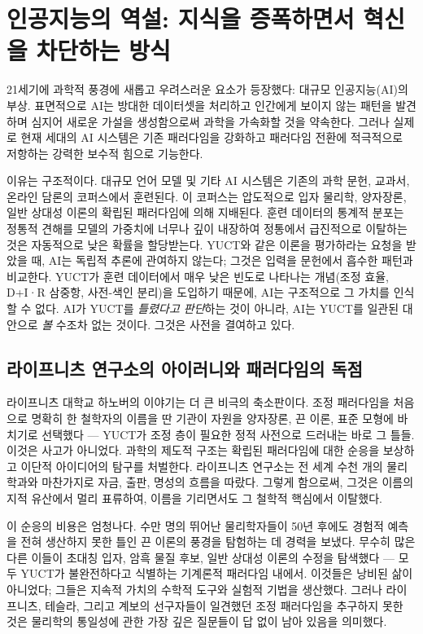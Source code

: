 \documentclass[12pt,a4paper]{article}
\begin{document}
	\section{인공지능의 역설: 지식을 증폭하면서 혁신을 차단하는 방식}
	
	21세기에 과학적 풍경에 새롭고 우려스러운 요소가 등장했다: 대규모 인공지능(AI)의 부상. 표면적으로 AI는 방대한 데이터셋을 처리하고 인간에게 보이지 않는 패턴을 발견하며 심지어 새로운 가설을 생성함으로써 과학을 가속화할 것을 약속한다. 그러나 실제로 현재 세대의 AI 시스템은 기존 패러다임을 강화하고 패러다임 전환에 적극적으로 저항하는 강력한 보수적 힘으로 기능한다.
	
	이유는 구조적이다. 대규모 언어 모델 및 기타 AI 시스템은 기존의 과학 문헌, 교과서, 온라인 담론의 코퍼스에서 훈련된다. 이 코퍼스는 압도적으로 입자 물리학, 양자장론, 일반 상대성 이론의 확립된 패러다임에 의해 지배된다. 훈련 데이터의 통계적 분포는 정통적 견해를 모델의 가중치에 너무나 깊이 내장하여 정통에서 급진적으로 이탈하는 것은 자동적으로 낮은 확률을 할당받는다. YUCT와 같은 이론을 평가하라는 요청을 받았을 때, AI는 독립적 추론에 관여하지 않는다; 그것은 입력을 문헌에서 흡수한 패턴과 비교한다. YUCT가 훈련 데이터에서 매우 낮은 빈도로 나타나는 개념(조정 효율, D+I·R 삼중항, 사전-색인 분리)을 도입하기 때문에, AI는 구조적으로 그 가치를 인식할 수 없다. AI가 YUCT를 \emph{틀렸다고 판단}하는 것이 아니라, AI는 YUCT를 일관된 대안으로 \emph{볼} 수조차 없는 것이다. 그것은 사전을 결여하고 있다.
	
	\subsection{라이프니츠 연구소의 아이러니와 패러다임의 독점}
	
	라이프니츠 대학교 하노버의 이야기는 더 큰 비극의 축소판이다. 조정 패러다임을 처음으로 명확히 한 철학자의 이름을 딴 기관이 자원을 양자장론, 끈 이론, 표준 모형에 바치기로 선택했다 — YUCT가 조정 층이 필요한 정적 사전으로 드러내는 바로 그 틀들. 이것은 사고가 아니었다. 과학의 제도적 구조는 확립된 패러다임에 대한 순응을 보상하고 이단적 아이디어의 탐구를 처벌한다. 라이프니츠 연구소는 전 세계 수천 개의 물리학과와 마찬가지로 자금, 출판, 명성의 흐름을 따랐다. 그렇게 함으로써, 그것은 이름의 지적 유산에서 멀리 표류하여, 이름을 기리면서도 그 철학적 핵심에서 이탈했다.
	
	이 순응의 비용은 엄청나다. 수만 명의 뛰어난 물리학자들이 50년 후에도 경험적 예측을 전혀 생산하지 못한 틀인 끈 이론의 풍경을 탐험하는 데 경력을 보냈다. 무수히 많은 다른 이들이 초대칭 입자, 암흑 물질 후보, 일반 상대성 이론의 수정을 탐색했다 — 모두 YUCT가 불완전하다고 식별하는 기계론적 패러다임 내에서. 이것들은 낭비된 삶이 아니었다; 그들은 지속적 가치의 수학적 도구와 실험적 기법을 생산했다. 그러나 라이프니츠, 테슬라, 그리고 계보의 선구자들이 일견했던 조정 패러다임을 추구하지 못한 것은 물리학의 통일성에 관한 가장 깊은 질문들이 답 없이 남아 있음을 의미했다.
	
\end{document}
